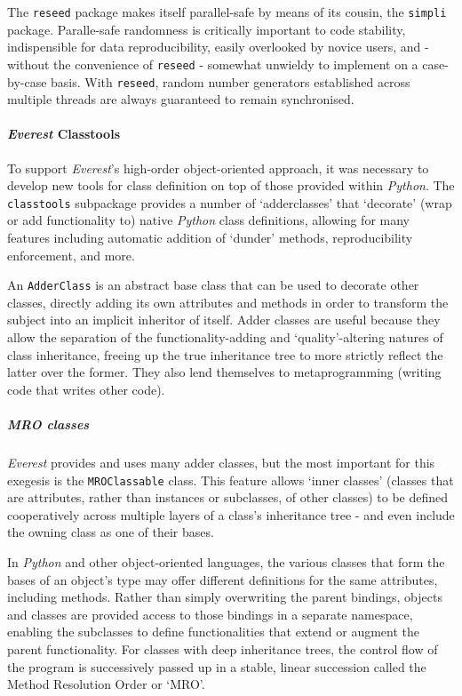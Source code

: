 \documentclass[a4paper,11pt,oneside]{book}
\begin{document}
The \texttt{reseed} package makes itself parallel-safe by means of its cousin, the \texttt{simpli} package. Paralle-safe randomness is critically important to code stability, indispensible for data reproducibility, easily overlooked by novice users, and - without the convenience of \texttt{reseed} - somewhat unwieldy to implement on a case-by-case basis. With \texttt{reseed}, random number generators established across multiple threads are always guaranteed to remain synchronised.

\paragraph{\textit{Everest} Classtools}

To support \textit{Everest}'s high-order object-oriented approach, it was necessary to develop new tools for class definition on top of those provided within \textit{Python}. The \texttt{classtools} subpackage provides a number of `adderclasses' that `decorate' (wrap or add functionality to) native \textit{Python} class definitions, allowing for many features including automatic addition of `dunder' methods, reproducibility enforcement, and more.

An \texttt{AdderClass} is an abstract base class that can be used to decorate other classes, directly adding its own attributes and methods in order to transform the subject into an implicit inheritor of itself. Adder classes are useful because they allow the separation of the functionality-adding and `quality'-altering natures of class inheritance, freeing up the true inheritance tree to more strictly reflect the latter over the former. They also lend themselves to metaprogramming (writing code that writes other code).

\subparagraph{MRO classes}

\textit{Everest} provides and uses many adder classes, but the most important for this exegesis is the \texttt{MROClassable} class. This feature allows `inner classes' (classes that are attributes, rather than instances or subclasses, of other classes) to be defined cooperatively across multiple layers of a class's inheritance tree - and even include the owning class as one of their bases.

In \textit{Python} and other object-oriented languages, the various classes that form the bases of an object's type may offer different definitions for the same attributes, including methods. Rather than simply overwriting the parent bindings, objects and classes are provided access to those bindings in a separate namespace, enabling the subclasses to define functionalities that extend or augment the parent functionality. For classes with deep inheritance trees, the control flow of the program is successively passed up in a stable, linear succession called the Method Resolution Order or `MRO'.
\end{document}
